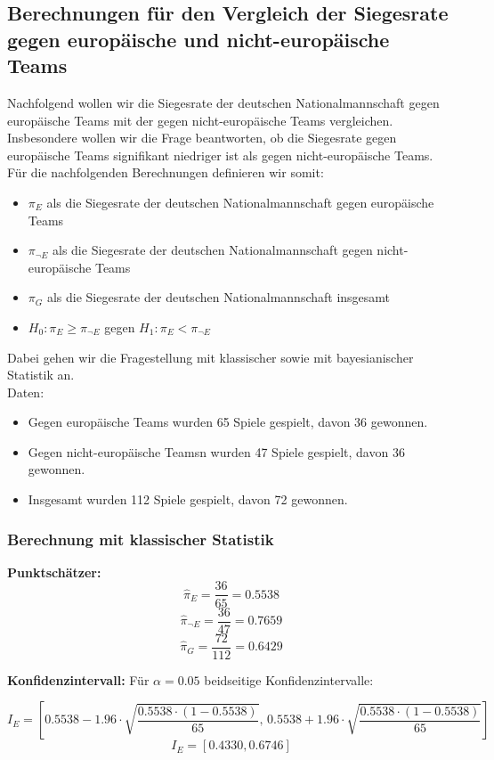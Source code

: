 \documentclass[a4paper,12pt]{article}
\begin{document}
\subsection{Berechnungen für den Vergleich der Siegesrate gegen europäische und nicht-europäische Teams}
Nachfolgend wollen wir die Siegesrate der deutschen Nationalmannschaft gegen europäische Teams mit der gegen nicht-europäische Teams vergleichen.
Insbesondere wollen wir die Frage beantworten, ob die Siegesrate gegen europäische Teams signifikant niedriger ist als gegen nicht-europäische Teams.
Für die nachfolgenden Berechnungen definieren wir somit:
\begin{itemize}
  \item \( \pi_E \) als die Siegesrate der deutschen Nationalmannschaft gegen europäische Teams
  \item \( \pi_{\neg E} \) als die Siegesrate der deutschen Nationalmannschaft gegen nicht-europäische Teams
  \item \( \pi_G \) als die Siegesrate der deutschen Nationalmannschaft insgesamt
  \item \( H_0 : \pi_E \geq \pi_{\neg E} \) gegen \( H_1 : \pi_E < \pi_{\neg E} \)
\end{itemize}
Dabei gehen wir die Fragestellung mit klassischer sowie mit bayesianischer Statistik an. \\

Daten:
\begin{itemize}
  \item Gegen europäische Teams wurden 65 Spiele gespielt, davon 36 gewonnen.
  \item Gegen nicht-europäische Teamsn wurden 47 Spiele gespielt, davon 36 gewonnen.
  \item Insgesamt wurden 112 Spiele gespielt, davon 72 gewonnen.
\end{itemize}

\subsubsection{Berechnung mit klassischer Statistik}

\textbf{Punktschätzer:}
\[
\hat{\pi}_E = \frac{36}{65} = 0.5538
\]
\[
\hat{\pi}_{\neg E} = \frac{36}{47} = 0.7659
\]
\[
\hat{\pi}_G = \frac{72}{112} = 0.6429
\]

\textbf{Konfidenzintervall:}
Für \(\alpha = 0.05\) beidseitige Konfidenzintervalle:

\[
I_E = \left[ 0.5538 - 1.96 \cdot \sqrt{\frac{0.5538 \cdot (1-0.5538)}{65}}, \, 0.5538 + 1.96 \cdot \sqrt{\frac{0.5538 \cdot (1-0.5538)}{65}} \right]
\]
\[
I_E = [0.4330, 0.6746]
\]
\end{document}
